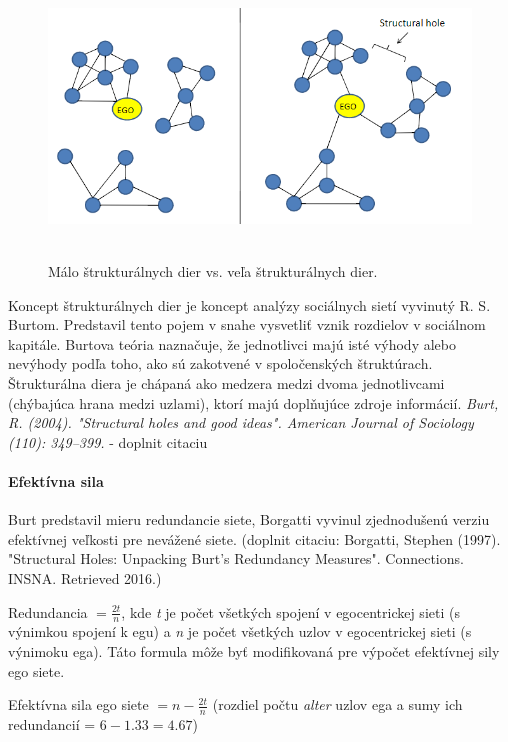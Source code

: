 \documentclass[slovak,master,public,dept460,male,cpdeclaration,oneside]{diploma}
\begin{document}
\begin{figure}[H]
\centering
\includegraphics[width=15cm, height=7.5cm]{figures/structuralholes}
\caption{Málo štrukturálnych dier vs. veľa štrukturálnych dier.}
\end{figure}


Koncept štrukturálnych dier je koncept analýzy sociálnych sietí vyvinutý R. S. Burtom. Predstavil tento pojem v snahe vysvetliť vznik rozdielov v sociálnom kapitále. Burtova teória naznačuje, že jednotlivci majú isté výhody alebo nevýhody podľa toho, ako sú zakotvené v spoločenských štruktúrach. Štrukturálna diera je chápaná ako medzera medzi dvoma jednotlivcami (chýbajúca hrana medzi uzlami), ktorí majú doplňujúce zdroje informácií. \textit{Burt, R. (2004). "Structural holes and good ideas". American Journal of Sociology (110): 349–399.} - doplnit citaciu

\paragraph{Efektívna sila}
\hfill \break
Burt predstavil mieru redundancie siete, Borgatti vyvinul zjednodušenú verziu efektívnej veľkosti pre nevážené siete. (doplnit citaciu:   Borgatti, Stephen (1997). "Structural Holes: Unpacking Burt's Redundancy Measures". Connections. INSNA. Retrieved 2016.)

 Redundancia ${ = \frac{2t}{n}}$, kde \textit{t} je počet všetkých spojení v egocentrickej sieti (s výnimkou spojení k egu) a \textit{n} je počet všetkých uzlov v egocentrickej sieti (s výnimoku ega). Táto formula môže byť modifikovaná pre výpočet efektívnej sily ego siete.

 Efektívna sila ego siete ${ = n - \frac{2t}{n}}$ (rozdiel počtu \textit{alter} uzlov ega a sumy ich redundancií = ${6-1.33 = 4.67}$)
\end{document}
